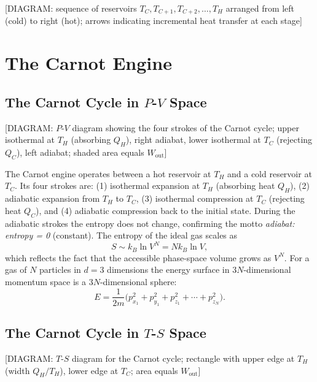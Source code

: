 \begin{center}[DIAGRAM: sequence of reservoirs $T_C, T_{C+1}, T_{C+2}, \ldots, T_H$ arranged from left (cold) to right (hot); arrows indicating incremental heat transfer at each stage]\end{center}

\chapter{The Carnot Engine}

\section{The Carnot Cycle in $P$-$V$ Space}

\begin{center}[DIAGRAM: $P$-$V$ diagram showing the four strokes of the Carnot cycle; upper isothermal at $T_H$ (absorbing $Q_H$), right adiabat, lower isothermal at $T_C$ (rejecting $Q_C$), left adiabat; shaded area equals $W_{\text{out}}$]\end{center}

The Carnot engine operates between a hot reservoir at $T_H$ and a cold reservoir at $T_C$. Its four strokes are: (1) isothermal expansion at $T_H$ (absorbing heat $Q_H$), (2) adiabatic expansion from $T_H$ to $T_C$, (3) isothermal compression at $T_C$ (rejecting heat $Q_C$), and (4) adiabatic compression back to the initial state. During the adiabatic strokes the entropy does not change, confirming the motto \emph{adiabat: entropy = 0} (constant). The entropy of the ideal gas scales as
\begin{equation}
    S \sim k_B \ln V^N = Nk_B \ln V,
\end{equation}
which reflects the fact that the accessible phase-space volume grows as $V^N$. For a gas of $N$ particles in $d = 3$ dimensions the energy surface in $3N$-dimensional momentum space is a $3N$-dimensional sphere:
\begin{equation}
    E = \frac{1}{2m}\bigl(p_{x_1}^2 + p_{y_1}^2 + p_{z_1}^2 + \cdots + p_{z_N}^2\bigr).
\end{equation}

\section{The Carnot Cycle in $T$-$S$ Space}

\begin{center}[DIAGRAM: $T$-$S$ diagram for the Carnot cycle; rectangle with upper edge at $T_H$ (width $Q_H/T_H$), lower edge at $T_C$; area equals $W_{\text{out}}$]\end{center}


